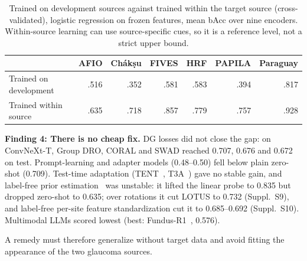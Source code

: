 \documentclass[runningheads]{llncs}
\newcommand{\sups}[1]{Suppl.~S#1}
\begin{document}
\begin{table}[tb]
\caption{Trained on development sources against trained within the target source (cross-validated), logistic regression on frozen features, mean bAcc over nine encoders. Within-source learning can use source-specific cues, so it is a reference level, not a strict upper bound.}\label{tab:ceiling}
\centering\scriptsize
\begin{tabular}{@{}lrrrrrr@{}}
\toprule
& AFIO & Ch\'ak\d{s}u & FIVES & HRF & PAPILA & Paraguay\\
\midrule
Trained on development & .516 & .352 & .581 & .583 & .394 & .817\\
Trained within source & .635 & .718 & .857 & .779 & .757 & .928\\
\bottomrule
\end{tabular}
\end{table}

\textbf{Finding 4: There is no cheap fix.} DG losses did not close the gap: on ConvNeXt-T, Group DRO, CORAL and SWAD reached 0.707, 0.676 and 0.672 on test. Prompt-learning and adapter models (0.48--0.50) fell below plain zero-shot (0.709). Test-time adaptation (TENT~\cite{tent}, T3A~\cite{t3a}) gave no stable gain, and label-free prior estimation~\cite{saerens} was unstable: it lifted the linear probe to 0.835 but dropped zero-shot to 0.635; over rotations it cut LOTUS to 0.732 (\sups{9}), and label-free per-site feature standardization cut it to 0.685--0.692 (\sups{10}). Multimodal LLMs scored lowest (best: Fundus-R1~\cite{fundusr1}, 0.576).

A remedy must therefore generalize without target data and avoid fitting the appearance of the two glaucoma sources.
\end{document}
